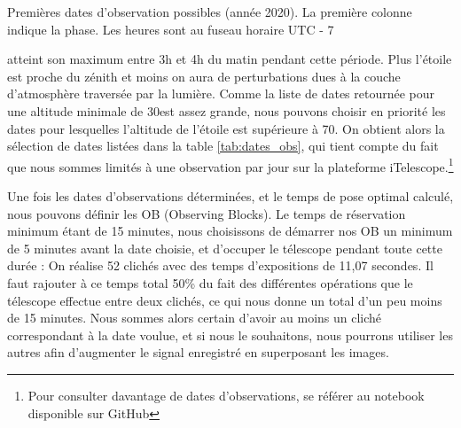 \documentclass[10pt,french, openany]{book}
\begin{document}
\begin{table}
            \caption{Premières dates d'observation possibles (année 2020). La première colonne indique la phase. Les heures sont au fuseau horaire UTC - 7}
            
            \label{tab:dates_30}
        \end{table}atteint son maximum entre 3h et 4h du matin pendant cette période. Plus l'étoile est proche du zénith et moins on aura de perturbations dues à la couche d'atmosphère traversée par la lumière. Comme la liste de dates retournée pour une altitude minimale de 30\degree est assez grande, nous pouvons choisir en priorité les dates pour lesquelles l'altitude de l'étoile est supérieure à 70\degree. On obtient alors la sélection de dates listées dans la table \ref{tab:dates_obs}, qui tient compte du fait que nous sommes limités à une observation par jour sur la plateforme iTelescope.\footnote{Pour consulter davantage de dates d'observations, se référer au notebook disponible sur GitHub}
        
        Une fois les dates d'observations déterminées, et le temps de pose optimal calculé, nous pouvons définir les OB (Observing Blocks). Le temps de réservation minimum étant de 15 minutes, nous choisissons de démarrer nos OB un minimum de 5 minutes avant la date choisie, et d'occuper le télescope pendant toute cette durée : On réalise 52 clichés avec des temps d'expositions de 11,07 secondes. Il faut rajouter à ce temps total 50\% du fait des différentes opérations que le télescope effectue entre deux clichés, ce qui nous donne un total d'un peu moins de 15 minutes. Nous sommes alors certain d'avoir au moins un cliché correspondant à la date voulue, et si nous le souhaitons, nous pourrons utiliser les autres afin d'augmenter le signal enregistré en superposant les images.
        
\end{document}
